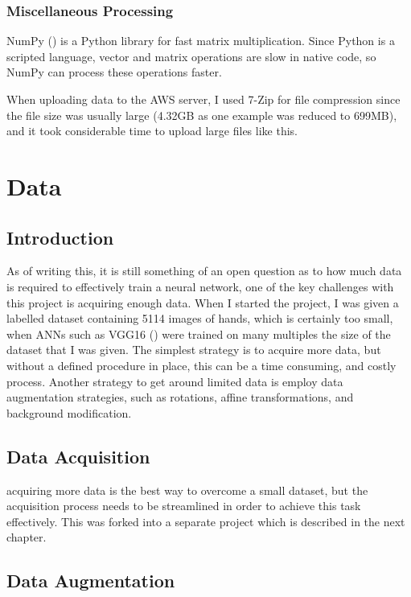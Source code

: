         \subsubsection{Miscellaneous Processing}
        NumPy (\cite{5725236}) is a Python library for fast matrix multiplication. Since Python is a scripted language, vector and matrix operations are slow in native code, so NumPy can process these operations faster.

        When uploading data to the AWS server, I used 7-Zip for file compression since the file size was usually large (4.32GB as one example was reduced to 699MB), and it took considerable time to upload large files like this.


\section{Data}
    \subsection{Introduction}
    As of writing this, it is still something of an open question as to how much data is required to effectively train a neural network, one of the key challenges with this project is acquiring enough data. When I started the project, I was given a labelled dataset containing 5114 images of hands, which is certainly too small, when ANNs such as VGG16 (\cite{vggnet}) were trained on many multiples the size of the dataset that I was given. The simplest strategy is to acquire more data, but without a defined procedure in place, this can be a time consuming, and costly process. Another strategy to get around limited data is employ data augmentation strategies, such as rotations, affine transformations, and background modification.

    \subsection{Data Acquisition}
    acquiring more data is the best way to overcome a small dataset, but the acquisition process needs to be streamlined in order to achieve this task effectively. This was forked into a separate project which is described in the next chapter.

    \subsection{Data Augmentation}
